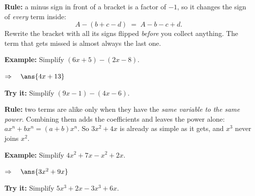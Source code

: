 \documentclass[12pt]{article}
\begin{document}


\begin{formulabox}
\textbf{Rule:} a minus sign in front of a bracket is a factor of $-1$, so it changes the sign of
\emph{every} term inside:
\[
  A - (b + c - d) \;=\; A - b - c + d .
\]
Rewrite the bracket with all its signs flipped \emph{before} you collect anything. The term that
gets missed is almost always the last one.
\end{formulabox}

\begin{examplebox}
\textbf{Example:} \quad Simplify $(6x + 5) - (2x - 8)$.

$\Rightarrow\quad \ans{4x + 13}$
\end{examplebox}

\begin{tryitbox}
\textbf{Try it:} \quad Simplify $(9x - 1) - (4x - 6)$.\\[2pt]
\end{tryitbox}


\begin{formulabox}
\textbf{Rule:} two terms are alike only when they have the \emph{same variable to the same power}.
Combining them adds the coefficients and leaves the power alone: $ax^n + bx^n = (a+b)x^n$.
So $3x^2 + 4x$ is already as simple as it gets, and $x^3$ never joins $x^2$.
\end{formulabox}

\begin{examplebox}
\textbf{Example:} \quad Simplify $4x^2 + 7x - x^2 + 2x$.

$\Rightarrow\quad \ans{3x^2 + 9x}$
\end{examplebox}

\begin{tryitbox}
\textbf{Try it:} \quad Simplify $5x^3 + 2x - 3x^3 + 6x$.\\[2pt]
\end{tryitbox}
\end{document}
